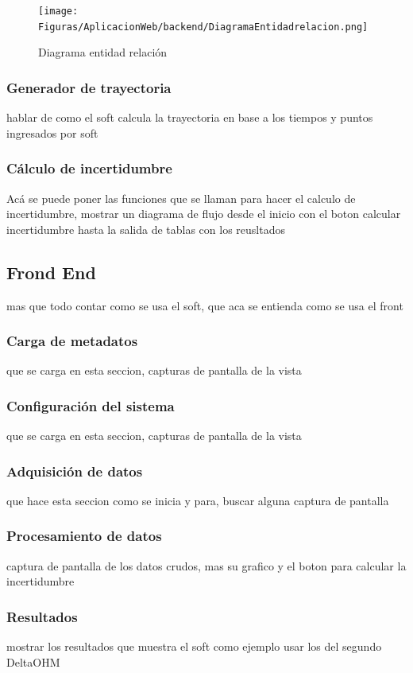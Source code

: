 \begin{figure}[H]
    \centering
    \texttt{[image: Figuras/AplicacionWeb/backend/DiagramaEntidadrelacion.png]}
    \caption{Diagrama entidad relación}
    \label{fig:DiagramaEntidadRelacion}
\end{figure}



\subsubsection{Generador de trayectoria}
hablar de como el soft calcula la trayectoria en base a los tiempos y puntos ingresados por soft
\subsubsection{Cálculo de incertidumbre}
Acá se puede poner las funciones que se llaman para hacer el calculo de incertidumbre, mostrar un diagrama de flujo desde el inicio con el boton calcular incertidumbre hasta la salida de tablas con los reusltados


\subsection{Frond End}\label{sec:frondEnd}
mas que todo contar como se usa el soft, que aca se entienda como se usa el front
\subsubsection{Carga de metadatos}
que se carga en esta seccion, capturas de pantalla de la vista
\subsubsection{Configuración del sistema}
que se carga en esta seccion, capturas de pantalla de la vista
\subsubsection{Adquisición de datos}
que hace esta seccion como se inicia y para, buscar alguna captura de pantalla

\subsubsection{Procesamiento de datos}
captura de pantalla de los datos crudos, mas su grafico y el boton para calcular la incertidumbre
\subsubsection{Resultados}
mostrar los resultados que muestra el soft como ejemplo usar los del segundo DeltaOHM

